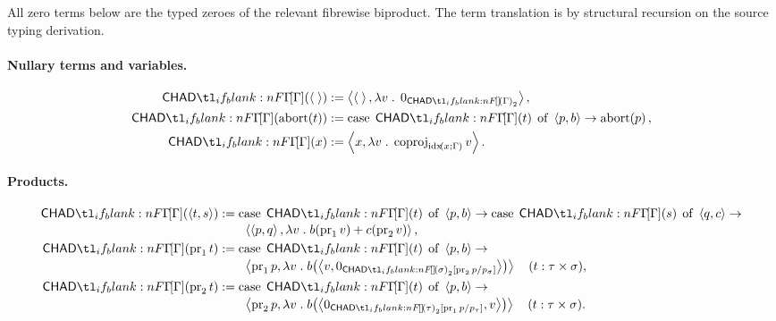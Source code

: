 \documentclass[11pt,a4paper]{article}
\theoremstyle{definition}
\theoremstyle{remark}
\providecommand{\casubst}[3]{#1[#3/#2]}
\begin{document}
All zero terms below are the typed zeroes of the relevant fibrewise biproduct.
The term translation is by structural recursion on the source typing derivation.

\paragraph{Nullary terms and variables.}
\begin{align}
  \label{eq:appendix-chad-unit}
  \Fun[np]{\chad[\Gamma]}{\tuple{\;}}
  &:=
  \tuple{
    \tuple{\;},
    \lambda v\; .\; \opn[b]{0}_{\Fun[np]{\chad}{\Gamma}_{2}}
  },
  \\
  \label{eq:appendix-chad-abort}
  \Fun[np]{\chad[\Gamma]}{\fn[n]{\opn[b]{abort}}{t}}
  &:=
  \opn[b]{case}\; \Fun[np]{\chad[\Gamma]}{t}\; \opn[b]{of}\;
  \tuple{p,b}\to
  \fn[n]{\opn[b]{abort}}{p},
  \\
  \label{eq:appendix-chad-variable}
  \Fun[np]{\chad[\Gamma]}{x}
  &:=
  \tuple{
    x,
    \lambda v\; .\;
    \opn[b]{coproj}_{\fn[n]{\opn{idx}}{x;\Gamma}}v
  }.
\end{align}

\paragraph{Products.}
\begin{align}
  \label{eq:appendix-chad-pair}
  \Fun[np]{\chad[\Gamma]}{\tuple{t,s}}
  &:=
  \opn[b]{case}\;\Fun[np]{\chad[\Gamma]}{t}\;\opn[b]{of}\;\tuple{p,b}\to
  \opn[b]{case}\;\Fun[np]{\chad[\Gamma]}{s}\;\opn[b]{of}\;\tuple{q,c}\to
  \notag\\[-2pt]
  &\qquad
  \tuple{
    \tuple{p,q},
    \lambda v\; .\;
    \fn[n]{b}{\opn[b]{pr}_{1}v}
    +
    \fn[n]{c}{\opn[b]{pr}_{2}v}
  },
  \\
  \label{eq:appendix-chad-pr1}
  \Fun[np]{\chad[\Gamma]}{\opn[b]{pr}_{1}t}
  &:=
  \opn[b]{case}\;\Fun[np]{\chad[\Gamma]}{t}\;\opn[b]{of}\;\tuple{p,b}\to
  \notag\\[-2pt]
  &\qquad
  \tuple{
    \opn[b]{pr}_{1}p,
    \lambda v\; .\;
    \fn[n]{b}{
      \tuple{
        v,
        \opn[b]{0}_{\casubst{\Fun[np]{\chad}{\sigma}_{2}}{p_{\sigma}}{\opn[b]{pr}_{2}p}}
      }
    }
  }
  \quad (t: \tau\times\sigma),
  \\
  \label{eq:appendix-chad-pr2}
  \Fun[np]{\chad[\Gamma]}{\opn[b]{pr}_{2}t}
  &:=
  \opn[b]{case}\;\Fun[np]{\chad[\Gamma]}{t}\;\opn[b]{of}\;\tuple{p,b}\to
  \notag\\[-2pt]
  &\qquad
  \tuple{
    \opn[b]{pr}_{2}p,
    \lambda v\; .\;
    \fn[n]{b}{
      \tuple{
        \opn[b]{0}_{\casubst{\Fun[np]{\chad}{\tau}_{2}}{p_{\tau}}{\opn[b]{pr}_{1}p}},
        v
      }
    }
  }
  \quad (t: \tau\times\sigma).
\end{align}
\end{document}
